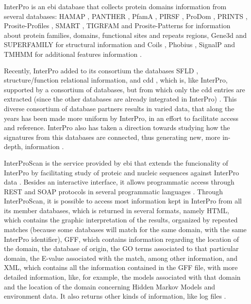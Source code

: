 \documentclass[
  oneside,
  11pt, a4paper,
  footinclude=true,
  headinclude=true,
  cleardoublepage=empty
]{scrbook}
\begin{document}
    InterPro is an \gls{ebi} database that collects protein domains information from several databases: HAMAP \citep{Lima2009}, PANTHER \citep{Thomas2003}, PfamA \citep{Finn2014}, PIRSF \citep{Wu2004}, ProDom \citep{Corpet1998}, PRINTS \citep{Attwood2002}, Prosite-Profiles \citep{Sigrist2002}, SMART \citep{Schultz2000}, TIGRFAM \citep{Haft2003} and Prosite-Patterns \citep{Sigrist2002} for information about protein families, domains, functional sites and repeats regions, Gene3d \citep{Buchan2002} and SUPERFAMILY \citep{Gough2002} for structural information and Coils \citep{Lupas1991}, Phobius \citep{Kall2004}, SignalP \citep{Emanuelsson2007} and TMHMM \citep{Krogh2001} for additional features information \citep{Hunter2009, Finn2016}. 
    
    Recently, InterPro added to its consortium the databases SFLD \citep{Akiva2014}, structure/function relational information, and \gls{cdd} \citep{Marchler-Bauer2015}, which is, like InterPro, supported by a consortium of databases, but from which only the \gls{cdd} entries are extracted (since the other databases are already integrated in InterPro) \citep{Finn2016}. This diverse consortium of database partners results in varied data, that along the years has been made more uniform by InterPro, in an effort to facilitate access and reference. InterPro also has taken a direction towards studying how the signatures from this databases are connected, thus generating new, more in-depth, information \citep{Hunter2009}.
    
    InterProScan is the service provided by \gls{ebi} that extends the funcionality of InterPro by facilitating study of proteic and nucleic sequences against InterPro data \citep{Zdobnov2001, Quevillon2005}. Besides an interactive interface, it allows programmatic access through REST and SOAP protocols in several programmatic languages \citep{Jones2014}. Through InterProScan, it is possible to access most information kept in InterPro from all its member databases, which is returned in several formats, namely HTML, which contains the graphic interpretation of the results, organized by repeated matches (because some databases will match for the same domain, with the same InterPro identifier), GFF, which contains information regarding the location of the domain, the database of origin, the GO terms associated to that particular domain, the E-value associated with the match, among other information, and XML, which contains all the information contained in the GFF file, with more detailed information, like, for example, the models associated with that domain and the location of the domain concerning Hidden Markov Models and environment data. It also returns other kinds of information, like log files \citep{Quevillon2005}.
    
\end{document}
